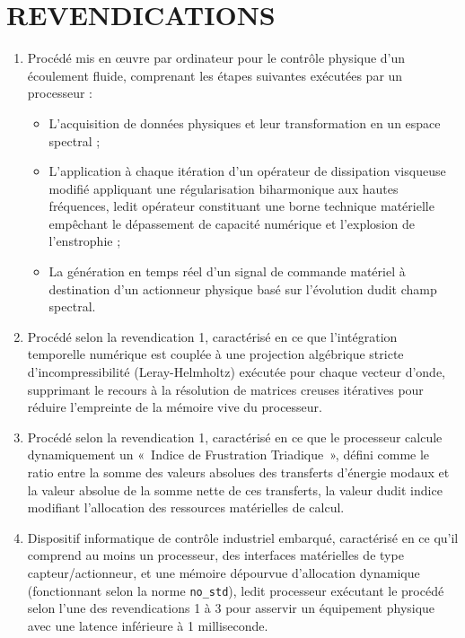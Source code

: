 \documentclass[11pt,a4paper]{article}
\begin{document}
\section{REVENDICATIONS}
\begin{enumerate}
    \item Procédé mis en œuvre par ordinateur pour le contrôle physique d'un écoulement fluide, comprenant les étapes suivantes exécutées par un processeur :
    \begin{itemize}
        \item L'acquisition de données physiques et leur transformation en un espace spectral ;
        \item L'application à chaque itération d'un opérateur de dissipation visqueuse modifié appliquant une régularisation biharmonique aux hautes fréquences, ledit opérateur constituant une borne technique matérielle empêchant le dépassement de capacité numérique et l'explosion de l'enstrophie ;
        \item La génération en temps réel d'un signal de commande matériel à destination d'un actionneur physique basé sur l'évolution dudit champ spectral.
    \end{itemize}
    \item Procédé selon la revendication 1, caractérisé en ce que l'intégration temporelle numérique est couplée à une projection algébrique stricte d'incompressibilité (Leray-Helmholtz) exécutée pour chaque vecteur d'onde, supprimant le recours à la résolution de matrices creuses itératives pour réduire l'empreinte de la mémoire vive du processeur.
    \item Procédé selon la revendication 1, caractérisé en ce que le processeur calcule dynamiquement un «~Indice de Frustration Triadique~», défini comme le ratio entre la somme des valeurs absolues des transferts d'énergie modaux et la valeur absolue de la somme nette de ces transferts, la valeur dudit indice modifiant l'allocation des ressources matérielles de calcul.
    \item Dispositif informatique de contrôle industriel embarqué, caractérisé en ce qu'il comprend au moins un processeur, des interfaces matérielles de type capteur/actionneur, et une mémoire dépourvue d'allocation dynamique (fonctionnant selon la norme \texttt{no\_std}), ledit processeur exécutant le procédé selon l'une des revendications 1 à 3 pour asservir un équipement physique avec une latence inférieure à 1 milliseconde.
\end{enumerate}
\end{document}
